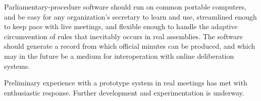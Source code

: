 \documentclass{book}
\begin{document}
Parliamentary-procedure software should run on common portable computers, and be easy for any organization's secretary to learn and use, streamlined enough to keep pace with live meetings, and flexible enough to handle the adaptive circumvention of rules that inevitably occurs in real assemblies. The software should generate a record from which official minutes can be produced, and which may in the future be a medium for interoperation with online deliberation systems.

Preliminary experience with a prototype system in real meetings has met with enthusiastic response. Further development and experimentation is underway.


 
\end{document}

